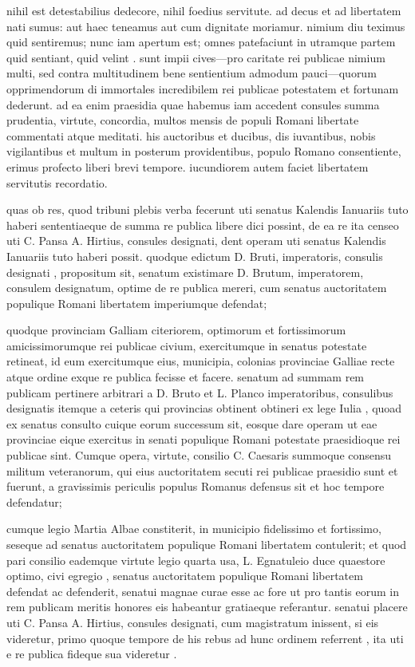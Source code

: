  nihil est detestabilius dedecore, nihil foedius servitute. ad decus et ad libertatem nati sumus: aut haec teneamus aut cum dignitate moriamur. nimium diu teximus quid sentiremus; nunc iam apertum est; omnes patefaciunt in utramque partem quid sentiant, quid velint . sunt impii cives—pro caritate rei publicae nimium multi, sed contra multitudinem bene sentientium admodum pauci—quorum opprimendorum di immortales incredibilem rei publicae potestatem et fortunam dederunt. ad ea enim praesidia quae habemus iam accedent consules summa prudentia, virtute, concordia, multos mensis de populi Romani libertate commentati atque meditati. his auctoribus et ducibus, dis iuvantibus, nobis vigilantibus et multum in posterum providentibus, populo Romano consentiente, erimus profecto liberi brevi tempore. iucundiorem autem faciet libertatem servitutis recordatio.

 quas ob res, quod tribuni plebis verba fecerunt uti senatus Kalendis Ianuariis tuto haberi sententiaeque de summa re publica libere dici possint, de ea re ita censeo uti C. Pansa A. Hirtius, consules designati, dent operam uti senatus Kalendis Ianuariis tuto haberi possit. quodque edictum D. Bruti, imperatoris, consulis designati , propositum sit, senatum existimare D. Brutum, imperatorem, consulem designatum, optime de re publica mereri, cum senatus auctoritatem populique Romani libertatem imperiumque defendat;

 quodque provinciam Galliam citeriorem, optimorum et fortissimorum amicissimorumque rei publicae civium, exercitumque in senatus potestate retineat, id eum exercitumque eius, municipia, colonias provinciae Galliae recte atque ordine exque re publica fecisse et facere. senatum ad summam rem publicam pertinere arbitrari a D. Bruto et L. Planco imperatoribus, consulibus designatis itemque a ceteris qui provincias obtinent obtineri ex lege Iulia , quoad ex senatus consulto cuique eorum successum sit, eosque dare operam ut eae provinciae eique exercitus in senati populique Romani potestate praesidioque rei publicae sint. Cumque opera, virtute, consilio C. Caesaris summoque consensu militum veteranorum, qui eius auctoritatem secuti rei publicae praesidio sunt et fuerunt, a gravissimis periculis populus Romanus defensus sit et hoc tempore defendatur;

 cumque legio Martia Albae constiterit, in municipio fidelissimo et fortissimo, seseque ad senatus auctoritatem populique Romani libertatem contulerit; et quod pari consilio eademque virtute legio quarta usa, L. Egnatuleio duce quaestore optimo, civi egregio , senatus auctoritatem populique Romani libertatem defendat ac defenderit, senatui magnae curae esse ac fore ut pro tantis eorum in rem publicam meritis honores eis habeantur gratiaeque referantur. senatui placere uti C. Pansa A. Hirtius, consules designati, cum magistratum inissent, si eis videretur, primo quoque tempore de his rebus ad hunc ordinem referrent , ita uti e re publica fideque sua videretur .
